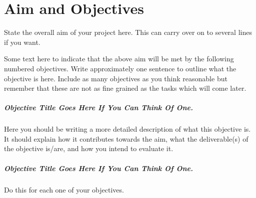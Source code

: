 \chapter{Aim and Objectives}



State the overall aim of your project here. This can carry over on to several lines if you want.

Some text here to indicate that the above aim will be met by the following numbered objectives. Write approximately one sentence to outline what the objective is here. Include as many objectives as you think reasonable but remember that these are not as fine grained as the tasks which will come later.

\paragraph{Objective Title Goes Here If You Can Think Of One.} 
Here you should be writing a more detailed description of what this objective is. It should explain how it contributes towards the aim, what the deliverable(s) of the objective is/are, and how you intend to evaluate it.

\paragraph{Objective Title Goes Here If You Can Think Of One.} 
Do this for each one of your objectives.